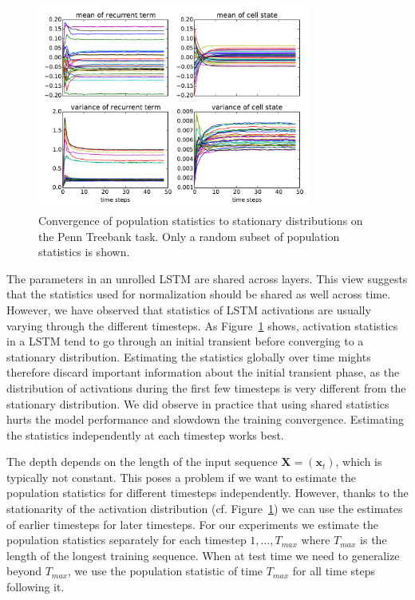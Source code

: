 \documentclass{article} %
\newcommand{\vect}[1]{\mathbf{#1}}
\newcommand{\mat}[1]{\mathbf{#1}}
\begin{document}
\begin{figure}
\center
\includegraphics[width=0.8\textwidth]{figures/popstat_stationarity.pdf}
\caption{Convergence of population statistics to stationary distributions on the Penn Treebank task. Only a random subset of population statistics is shown.}
\label{fig:popstat_stationarity}
\end{figure}

The parameters in an unrolled LSTM are shared across layers.
This view suggests that the statistics used for normalization should be shared as well across time.
However, we have observed that statistics of LSTM activations
 are usually varying  through the different timesteps. As Figure~\ref{fig:popstat_stationarity}  shows, activation statistics in a LSTM tend to go through an initial transient before converging to a stationary distribution.
Estimating the statistics globally over time mights therefore discard
important information about the initial transient phase,
as the distribution of activations during the first few timesteps is very different from the stationary distribution. We did observe in practice that using shared statistics hurts the model performance and slowdown the
training convergence.
Estimating the statistics independently at each timestep works best.

The depth depends on the length of the input sequence $\mat{X} = (\vect{x}_t)$, which is typically not constant.
This poses a problem if we want to estimate the population statistics for different timesteps independently.
However, thanks to the stationarity of the activation distribution (cf. Figure~\ref{fig:popstat_stationarity}) we can use the estimates of earlier timesteps for later timesteps.
For our experiments we estimate the population statistics separately for each timestep $1, \ldots, T_{max}$ where $T_{max}$ is the length of the longest training sequence.
When at test time we need to generalize beyond $T_{max}$, we use the population statistic of time $T_{max}$ for all time steps following it.
\end{document}
